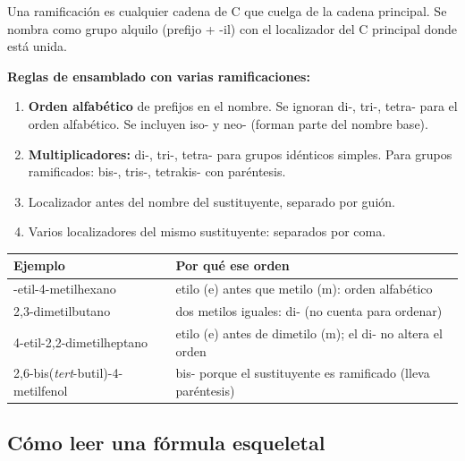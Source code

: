 Una ramificación es cualquier cadena de C que cuelga de la cadena principal. Se nombra
como grupo alquilo (prefijo + -il) con el localizador del C principal donde está unida.

\textbf{Reglas de ensamblado con varias ramificaciones:}

\begin{enumerate}
\item \textbf{Orden alfabético} de prefijos en el nombre. Se ignoran di-, tri-, tetra-
  para el orden alfabético. Se incluyen iso- y neo- (forman parte del nombre base).
\item \textbf{Multiplicadores:} di-, tri-, tetra- para grupos idénticos simples.
  Para grupos ramificados: bis-, tris-, tetrakis- con paréntesis.
\item Localizador antes del nombre del sustituyente, separado por guión.
\item Varios localizadores del mismo sustituyente: separados por coma.
\end{enumerate}

\begin{center}
\renewcommand{\arraystretch}{1.5}
\begin{longtable}{L{5.5cm} L{8.0cm}}
\toprule
\textbf{Ejemplo} & \textbf{Por qué ese orden} \\
\midrule\endhead\bottomrule{}-etil-4-metilhexano
  & etilo (e) antes que metilo (m): orden alfabético \\
\midrule{}
2,3-dimetilbutano
  & dos metilos iguales: di- (no cuenta para ordenar) \\
\midrule{}
4-etil-2,2-dimetilheptano
  & etilo (e) antes de dimetilo (m); el di- no altera el orden \\
\midrule{}
2,6-bis(\textit{tert}-butil)-4-metilfenol
  & bis- porque el sustituyente es ramificado (lleva paréntesis) \\
\end{longtable}
\end{center}

{}
\subsection*{\textcolor{blueunam}{Cómo leer una fórmula esqueletal}}

